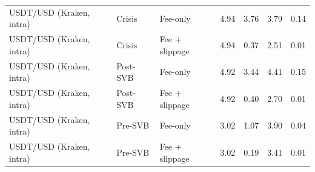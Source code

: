 \begin{table}[H]
{\begin{tabular}{lllrrrr}
USDT/USD (Kraken, intra) & Crisis & Fee-only & 4.94 & 3.76 & 3.79 & 0.14 \\
USDT/USD (Kraken, intra) & Crisis & Fee + slippage & 4.94 & 0.37 & 2.51 & 0.01 \\
USDT/USD (Kraken, intra) & Post-SVB & Fee-only & 4.92 & 3.44 & 4.41 & 0.15 \\
USDT/USD (Kraken, intra) & Post-SVB & Fee + slippage & 4.92 & 0.40 & 2.70 & 0.01 \\
USDT/USD (Kraken, intra) & Pre-SVB & Fee-only & 3.02 & 1.07 & 3.90 & 0.04 \\
USDT/USD (Kraken, intra) & Pre-SVB & Fee + slippage & 3.02 & 0.19 & 3.41 & 0.01 \\
\bottomrule
\end{tabular}%
}
\end{table}
